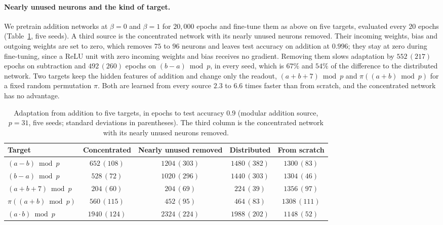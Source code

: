 \documentclass{article} %
\begin{document}
\paragraph{Nearly unused neurons and the kind of target.} We pretrain addition networks at $\beta = 0$ and $\beta = 1$ for $20{,}000$ epochs and fine-tune them as above on five targets, evaluated every $20$ epochs (Table~\ref{tab:spare}, five seeds). A third source is the concentrated network with its nearly unused neurons removed. Their incoming weights, bias and outgoing weights are set to zero, which removes $75$ to $96$ neurons and leaves test accuracy on addition at $0.996$; they stay at zero during fine-tuning, since a ReLU unit with zero incoming weights and bias receives no gradient. Removing them slows adaptation by $552\,(217)$ epochs on subtraction and $492\,(260)$ epochs on $(b - a) \bmod p$, in every seed, which is $67\%$ and $54\%$ of the difference to the distributed network. Two targets keep the hidden features of addition and change only the readout, $(a + b + 7) \bmod p$ and $\pi((a + b) \bmod p)$ for a fixed random permutation $\pi$. Both are learned from every source $2.3$ to $6.6$ times faster than from scratch, and the concentrated network has no advantage.

\begin{table}[!ht]
\caption{Adaptation from addition to five targets, in epochs to test accuracy $0.9$ (modular addition source, $p=31$, five seeds; standard deviations in parentheses). The third column is the concentrated network with its nearly unused neurons removed.}
\label{tab:spare}
\begin{center}
\small
\setlength{\tabcolsep}{4pt}
\begin{tabular}{lcccc}
\toprule
Target & Concentrated & Nearly unused removed & Distributed & From scratch \\
\midrule
$(a - b) \bmod p$ & $652\,(108)$ & $1204\,(303)$ & $1480\,(382)$ & $1300\,(83)$ \\
$(b - a) \bmod p$ & $528\,(72)$ & $1020\,(296)$ & $1440\,(303)$ & $1304\,(46)$ \\
$(a + b + 7) \bmod p$ & $204\,(60)$ & $204\,(69)$ & $224\,(39)$ & $1356\,(97)$ \\
$\pi((a + b) \bmod p)$ & $560\,(115)$ & $452\,(95)$ & $464\,(83)$ & $1308\,(111)$ \\
$(a \cdot b) \bmod p$ & $1940\,(124)$ & $2324\,(224)$ & $1988\,(202)$ & $1148\,(52)$ \\
\bottomrule
\end{tabular}
\end{center}
\end{table}
\end{document}
